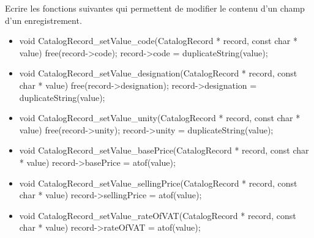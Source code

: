 Ecrire les fonctions suivantes qui permettent de modifier le contenu d'un champ d'un enregistrement.
\begin{itemize}
  \item {}
\begin{csourcecorrection}
void CatalogRecord_setValue_code(CatalogRecord * record, const char * value) {
    free(record->code);
    record->code = duplicateString(value);
}
\end{csourcecorrection}
  \item {}
\begin{csourcecorrection}
void CatalogRecord_setValue_designation(CatalogRecord * record, const char * value) {
    free(record->designation);
    record->designation = duplicateString(value);
}
\end{csourcecorrection}
  \item {}
\begin{csourcecorrection}
void CatalogRecord_setValue_unity(CatalogRecord * record, const char * value) {
    free(record->unity);
    record->unity = duplicateString(value);
}
\end{csourcecorrection}
  \item {}
\begin{csourcecorrection}
void CatalogRecord_setValue_basePrice(CatalogRecord * record, const char * value) {
    record->basePrice = atof(value);
}
\end{csourcecorrection}
  \item {}
\begin{csourcecorrection}
void CatalogRecord_setValue_sellingPrice(CatalogRecord * record, const char * value) {
    record->sellingPrice = atof(value);
}
\end{csourcecorrection}
  \item {}
\begin{csourcecorrection}
void CatalogRecord_setValue_rateOfVAT(CatalogRecord * record, const char * value) {
    record->rateOfVAT = atof(value);
}
\end{csourcecorrection}
\end{itemize}


